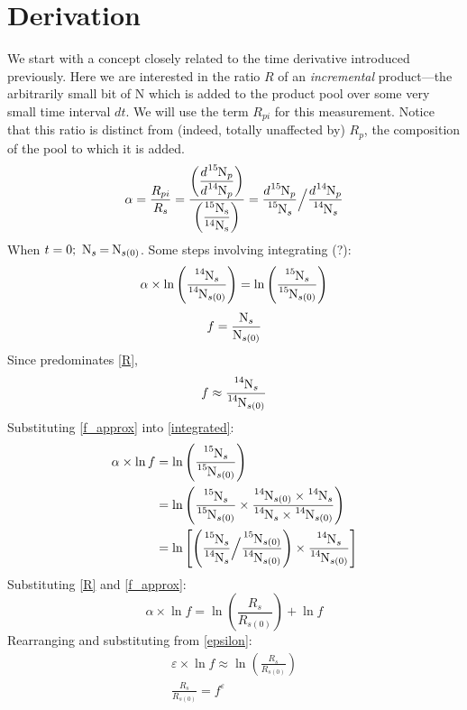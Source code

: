\documentclass[12pt, twocolumn]{article}
\begin{document}
\section{Derivation}
We start with a concept closely related to the time derivative introduced previously. Here we are interested in the ratio $R$ of an \emph{incremental} product---the arbitrarily small bit of N which is added to the product pool over some very small time interval $dt$. We will use the term $R_{pi}$ for this measurement. Notice that this ratio is distinct from (indeed, totally unaffected by) $R_p$, the composition of the pool to which it is added.
\begin{equation}
    \alpha=\dfrac{R_{pi}}{R_s}=\frac{\left(\dfrac{d\ce{^{15}N_p}}{d\ce{^{14}N_p}}\right)}{\left(\ce{\dfrac{^{15}N_s}{^{14}N_s}}\right)}=\frac{d\ce{^{15}N_p}}{\ce{^{15}N_s}}\Big/\frac{d\ce{^{14}N_p}}{\ce{^{14}N_s}}\label{alpha/R}
\end{equation}
When $t=0;\ \ce{N_s = N_{s(0)}}$. Some steps involving integrating (?):
\begin{equation}
    \alpha \times \ln{\left(\frac{\ce{^{14}N_s}}{\ce{^{14}N_{s(0)}}}\right)}=\ln{\left(\frac{\ce{^{15}N_s}}{\ce{^{15}N_{s(0)}}}\right)}\label{integrated}
\end{equation}
\begin{equation}
    f = \ce{\frac{N_s}{N_{s(0)}}}\label{f}
\end{equation}
Since  predominates \eqref{R},
\begin{equation}
    f \approx \ce{\frac{^{14}N_s}{^{14}N_{s(0)}}}\label{f_approx}
\end{equation}
Substituting \eqref{f_approx} into \eqref{integrated}:
\begin{align*}
    \alpha \times \ln{f} &=\ln{\left(\frac{\ce{^{15}N_s}}{\ce{^{15}N_{s(0)}}}\right)}\\
    &=\ln{\left(\frac{\ce{^{15}N_s}}{\ce{^{15}N_{s(0)}}}\times\frac{\ce{^{14}N_{s(0)}\times^{14}N_s}}{\ce{^{14}N_s\times^{14}N_{s(0)}}}\right)}\\
    &=\ln{\left[\left(\ce{\frac{^{15}N_s}{^{14}N_s}}\Big/\ce{\frac{^{15}N_{s(0)}}{^{14}N_{s(0)}}}\right)\times\ce{\frac{^{14}N_s}{^{14}N_{s(0)}}}\right]}
\end{align*}
Substituting \eqref{R} and \eqref{f_approx}:
\begin{equation}
    \alpha \times \ln{f} = \ln{\left(\frac{R_s}{R_{s(0)}}\right)}+\ln{f}
\end{equation}
Rearranging and substituting from \eqref{epsilon}:
\begin{gather}
    \varepsilon \times \ln{f} \approx \ln{\left(\frac{R_s}{R_{s(0)}}\right)}\label{epsilon*lnf}\\
    \frac{R_s}{R_{s(0)}}=f^\varepsilon
\end{gather}
\end{document}
